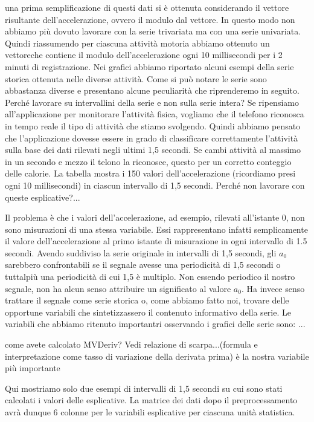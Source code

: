 %
una prima semplificazione di questi dati si è ottenuta considerando il vettore risultante dell\rq{}accelerazione, ovvero il modulo dal vettore. In questo modo non abbiamo più dovuto lavorare con la serie trivariata ma con una serie univariata.
Quindi riassumendo per ciascuna attività motoria abbiamo ottenuto un vettoreche contiene il modulo dell\rq{}accelerazione ogni 10 millisecondi per i 2 minuti di registrazione.
Nei grafici abbiamo riportato alcuni esempi della serie storica ottenuta nelle diverse attività. Come si può notare le serie sono abbastanza diverse e presentano alcune peculiarità che riprenderemo in seguito.
%
Perché lavorare su intervallini della serie e non sulla serie intera? Se ripensiamo all\rq{}applicazione per monitorare l\rq{}attività fisica, vogliamo che il telefono riconosca in tempo reale il tipo di attività che stiamo svolgendo. Quindi abbiamo pensato che l\rq{}applicazione dovesse essere in grado di classificare correttamente l\rq{}attività sulla base dei dati rilevati negli ultimi 1,5 secondi. Se cambi attività al massimo in un secondo e mezzo il telono la riconosce, questo per un corretto conteggio delle calorie. 
La tabella mostra i 150 valori dell\rq{}accelerazione (ricordiamo presi ogni 10 millisecondi) in ciascun intervallo di 1,5 secondi. Perché non lavorare con queste esplicative?...
%

%
Il problema è che i valori dell\rq{}accelerazione, ad esempio, rilevati all\rq{}istante 0, non sono misurazioni di una stessa variabile. Essi rappresentano infatti semplicamente il valore dell\rq{}accelerazione al primo istante di misurazione in ogni intervallo di 1.5 secondi. Avendo suddiviso la serie originale  in intervalli di 1,5 secondi, gli $a_0$ sarebbero confrontabili se il segnale avesse una periodicità di 1,5 secondi o tuttalpiù una periodicità di cui 1,5 è multiplo. Non essendo periodico il nostro segnale, non ha alcun senso attribuire un significato al valore $a_0$. Ha invece senso trattare il segnale come serie storica o, come abbiamo fatto noi, trovare delle opportune variabili che sintetizzassero il contenuto informativo della serie. Le variabili che abbiamo ritenuto importantri osservando i grafici delle serie sono: ...
%

come avete calcolato MVDeriv?
Vedi relazione di scarpa...(formula e interpretazione come tasso di variazione della derivata prima)
è la nostra variabile più importante
%

%
Qui mostriamo solo due esempi di intervalli di 1,5 secondi su cui sono stati calcolati i valori delle esplicative. La matrice dei dati dopo il preprocessamento avrà dunque 6 colonne per le variabili esplicative per ciascuna unità statistica.
%

